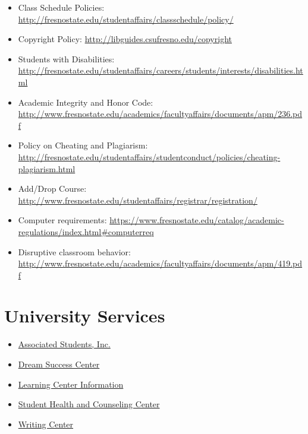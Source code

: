 \begin{itemize}
\tightlist
\item
  Class Schedule Policies:
  \url{http://fresnostate.edu/studentaffairs/classschedule/policy/}
\item
  Copyright Policy: \url{http://libguides.csufresno.edu/copyright}
\item
  Students with Disabilities:
  \url{http://fresnostate.edu/studentaffairs/careers/students/interests/disabilities.html}
\item
  Academic Integrity and Honor Code:
  \url{http://www.fresnostate.edu/academics/facultyaffairs/documents/apm/236.pdf}
\item
  Policy on Cheating and Plagiarism:
  \url{http://fresnostate.edu/studentaffairs/studentconduct/policies/cheating-plagiarism.html}
\item
  Add/Drop Course:
  \url{http://www.fresnostate.edu/studentaffairs/registrar/registration/}
\item
  Computer requirements:
  \url{https://www.fresnostate.edu/catalog/academic-regulations/index.html\#computerreq}
\item
  Disruptive classroom behavior:
  \url{http://www.fresnostate.edu/academics/facultyaffairs/documents/apm/419.pdf}
\end{itemize}

\hypertarget{university-services}{%
\section{University Services}\label{university-services}}

\begin{itemize}
\tightlist
\item
  \href{http://fresnostateasi.org/}{Associated Students, Inc.}
\item
  \href{http://fresnostate.edu/studentaffairs/dsc/index.html}{Dream
  Success Center}
\item
  \href{http://fresnostate.edu/studentaffairs/lrc}{Learning Center
  Information}
\item
  \href{https://www.fresnostate.edu/studentaffairs/health/}{Student
  Health and Counseling Center}
\item
  \href{http://www.fresnostate.edu/artshum/writingcenter/}{Writing
  Center}
\end{itemize}
